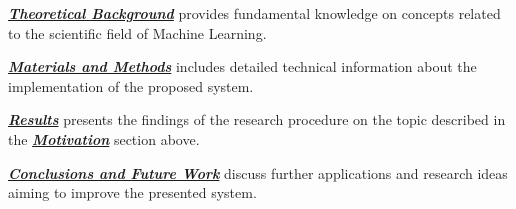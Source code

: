     \hyperref[chapter:theoretical_background]{\textit{\textbf{Theoretical Background}}} provides fundamental knowledge on concepts related to the scientific field of Machine Learning.

    \hyperref[chapter:materials_methods]{\textit{\textbf{Materials and Methods}}} includes detailed technical information about the implementation of the proposed system. 

    \hyperref[chapter:results]{\textit{\textbf{Results}}} presents the findings of the research procedure on the topic described in the \hyperref[sec:motivation]{\textbf{\textit{Motivation}}} section above.

    \hyperref[chapter:conclusions_futurework]{\textit{\textbf{Conclusions and Future Work}}} discuss further applications and research ideas aiming to improve the presented system.